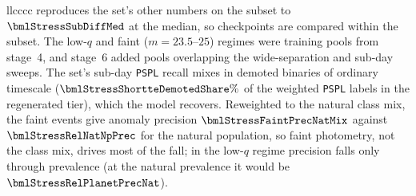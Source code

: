 \documentclass[twocolumn,linenumbers,floatfix,twocolappendix]{aastex701}
\begin{document}
\begin{deluxetable*}{llcccc}
{reproduces the set's other numbers on the subset to $\bmlStressSubDiffMed$ at the median, so checkpoints are compared
within the subset. The low-$q$ and faint ($m = 23.5$--$25$) regimes were training pools from stage~4, and stage~6 added
pools overlapping the wide-separation and sub-day sweeps. The set's sub-day \texttt{PSPL} recall mixes in demoted
binaries of ordinary timescale ($\bmlStressShortteDemotedShare\%$ of the weighted \texttt{PSPL} labels in the
regenerated tier), which the model recovers. Reweighted to the natural class mix, the faint events give anomaly
precision $\bmlStressFaintPrecNatMix$ against $\bmlStressRelNatNpPrec$ for the natural population, so faint photometry,
not the class mix, drives most of the fall; in the low-$q$ regime precision falls only through prevalence (at the
natural prevalence it would be $\bmlStressRelPlanetPrecNat$).}
\end{deluxetable*}
\end{document}

